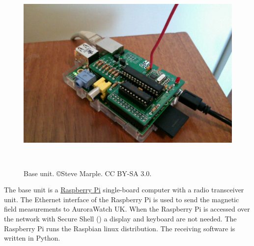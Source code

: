 \begin{figure}
  \centering
  \includegraphics[keepaspectratio,height=10cm]{images/base-unit}
  \caption[Base unit]%
  {Base unit. \small{\copyright Steve Marple. CC BY-SA 3.0.}}
  \label{fig:base-unit}
\end{figure}

The base unit is a \href{http://www.raspberrypi.org/‎}{Raspberry Pi}
single-board computer with a radio transceiver unit. The Ethernet
interface of the Raspberry Pi is used to send the magnetic field
measurements to AuroraWatch UK. When the Raspberry Pi is accessed over
the network with Secure Shell (\ssh) a display and keyboard are not
needed. The Raspberry Pi runs the Raspbian linux distribution. The
receiving software is written in Python.

